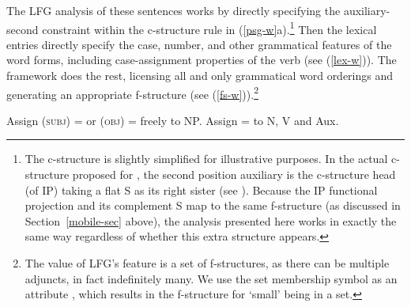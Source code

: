 The LFG analysis of these sentences works by directly specifying the auxiliary-second constraint within the c-structure rule in (\ref{psg-w}a).\footnote{The c-structure is slightly simplified for illustrative purposes. In the actual c-structure proposed for , the second position auxiliary is the c-structure head (of IP) taking a flat S as its right sister (see \citealt[225]{austin+bresnan:1996}).  Because the IP functional projection and its complement S map to the same f-structure (as discussed in Section~\ref{mobile-sec} above),  the analysis presented here works in exactly the same way regardless of whether this extra structure appears.}  Then the lexical entries directly specify the case, number, and other grammatical features of the word forms, including case-assignment properties of the verb (see (\ref{lex-w})).  The framework does the rest, licensing all and only grammatical word orderings and generating an appropriate f-structure (see (\ref{fs-w})).\footnote{The value of LFG's  feature is a set of f-structures, as there can be multiple adjuncts, in fact indefinitely many. We use the set membership symbol as an attribute \citep[229--230]{dalrymple;ea19}, which results in the f-structure for `small' being in a set.}

\eal  \label{psg-w}
\ex
{
}

\ex 
{
}
\zl


\eal  \label{ann-w}
\ex
\label{ann-w-a}
{ Assign (\up \textsc{subj}) = \down or (\up \textsc{obj}) = \down freely to NP.
\ex 
\label{ann-w-b}
{ Assign \up = \down to N, V and Aux.} }
\zl


\eal \label{lex-w} 
\ex 
{\qquad{}}

\ex 
{\qquad{}}

